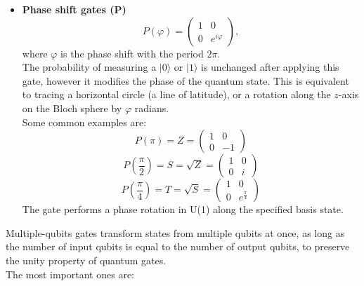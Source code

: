 \begin{itemize}
    \item \textbf{Phase shift gates (P)}
    \begin{equation}
        P(\varphi) = \left( \begin{array}{cc} 1 & 0 \\
                                              0 & e^{i\varphi} \end{array} \right),
    \end{equation}
    where $\varphi$ is the phase shift with the period $2\pi$. \\
    The probability of measuring a $|0\rangle$ or $|1\rangle$ is unchanged after applying this gate, however it modifies the phase of the quantum state. This is equivalent to tracing a horizontal circle (a line of latitude), or a rotation along the $z$-axis on the Bloch sphere by $\varphi$ radians. \\
    Some common examples are:
    \begin{equation}
        P(\pi) = Z = \left( \begin{array}{cc} 1 & 0 \\
                                              0 & -1 \end{array} \right)
    \end{equation}
    \begin{equation}
        P\left(\frac{\pi}{2}\right) = S = \sqrt{Z} = \left( \begin{array}{cc} 1 & 0 \\
                                                                0 & i \end{array} \right)
    \end{equation}
    \begin{equation}
        P\left(\frac{\pi}{4}\right) = T = \sqrt{S} = \left( \begin{array}{cc} 1 & 0 \\
                                                        0 & e^{\frac{\pi}{4}} \end{array} \right)
    \end{equation}
    The gate performs a phase rotation in U(1) along the specified basis state.
\end{itemize}
Multiple-qubits gates transform states from multiple qubits at once, as long as the number of input qubits is equal to the number of output qubits, to preserve the unity property of quantum gates. \\
The most important ones are:

